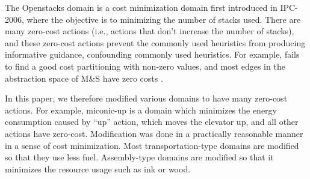 The Openstacks domain is a cost
minimization domain first introduced in IPC-2006, where the objective is to 
minimizing the number of stacks used.
There are many zero-cost actions (i.e., actions that don't increase the number of stacks), and
these zero-cost actions prevent the commonly used heuristics from producing
informative guidance, confounding commonly used heuristics.
For example, \lmcut \cite{Helmert2009} fails to find a good cost
partitioning with non-zero values, and most edges in the abstraction
space of M\&S have zero costs \cite{helmert2007flexible}.




In this paper, we therefore modified various domains to have many
zero-cost actions.  For example, miconic-up is a domain which minimizes
the energy consumption caused by ``up'' action, which moves the elevator
up, and all other actions have zero-cost.  Modification was done in a
practically reasonable manner in a sense of cost minimization. Most
transportation-type domains are modified so that they use less
fuel. Assembly-type domains are modified so that it minimizes the
resource usage such as ink or wood.  





